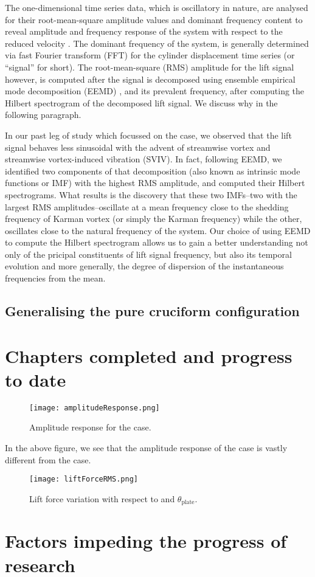 \documentclass[a4paper]{article}
\begin{document}
The one-dimensional time series data, which is oscillatory in nature, are analysed for their root-mean-square amplitude values and dominant frequency content to reveal amplitude and frequency response of the system with respect to the reduced velocity \ured{}. The dominant frequency of the system, is generally determined via fast Fourier transform (FFT) for the cylinder displacement time series (or ``signal'' for short). The root-mean-square (RMS) amplitude for the lift signal however, is computed after the signal is decomposed using ensemble empirical mode decomposition (EEMD) \parencite{Huang1998,Wu2008}, and its prevalent frequency, after computing the Hilbert spectrogram of the decomposed lift signal. We discuss why in the following paragraph.

In our past leg of study which focussed on the \rfo{} case, we observed that the lift signal behaves less sinusoidal with the advent of streamwise vortex and streamwise vortex-induced vibration (SVIV). In fact, following EEMD, we identified two components of that decomposition (also known as intrinsic mode functions or IMF) with the highest RMS amplitude, and computed their Hilbert spectrograms. What results is the discovery that these two IMFs--two with the largest RMS amplitudes--oscillate at a mean frequency close to the shedding frequency of Karman vortex (or simply the Karman frequency) while the other, oscillates close to the natural frequency of the system. Our choice of using EEMD to compute the Hilbert spectrogram allows us to gain a better understanding not only of the pricipal constituents of lift signal frequency, but also its temporal evolution and more generally, the degree of dispersion of the instantaneous frequencies from the mean. 

\subsection{Generalising the pure cruciform configuration}

\section{Chapters completed and progress to date}
\begin{figure}[h]
  \centering
  \texttt{[image: amplitudeResponse.png]}
  \caption{Amplitude response for the \rze{} case.}
  \label{fig:ampresp}
\end{figure}

In the above figure, we see that the amplitude response of the \rze{} case is vastly different from the \rfo{} case.
\newpage

\begin{figure}[h]
  \centering
  \texttt{[image: liftForceRMS.png]}
  \caption{Lift force variation with respect to \ured{} and $\theta_{\text{plate}}$.}
  \label{fig:liftevo}
\end{figure}

\newpage

\section{Factors impeding the progress of research}

\printbibliography
\end{document}
